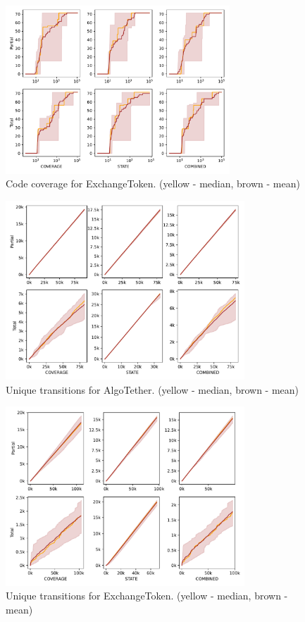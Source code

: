 \begin{figure}[htbp]
    \centering
    \includegraphics*[width=0.75\textwidth]{charts/ExchangeToken_range.pdf}
    \caption{Code coverage for ExchangeToken. (yellow - median, brown - mean)}
    \label{fig:ExchangeToken range}
\end{figure}



\begin{figure}[htbp]
    \centering
    \includegraphics*[width=0.8\textwidth]{charts/AlgoTether_range_trans copy.pdf}
    \caption{Unique transitions for AlgoTether. (yellow - median, brown - mean)}
    \label{fig:atrangetrans}
\end{figure}


\begin{figure}[htbp]
    \centering
    \includegraphics*[width=0.8\textwidth]{charts/ExchangeToken_range_trans copy.pdf}
    \caption{Unique transitions for ExchangeToken. (yellow - median, brown - mean)}
    \label{fig:etrangetrans}
\end{figure}